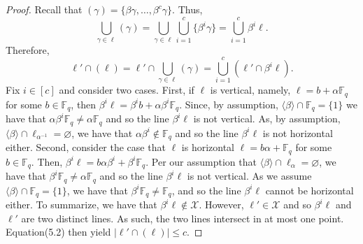 \begin{proof}
Recall that $(\gamma)=\{\beta\gamma,\ldots,\beta^c\gamma\}$. Thus,
\[\bigcup_{\gamma\in\ell}(\gamma)=\bigcup_{\gamma\in\ell}\bigcup_{i=1}^c\{\beta^i\gamma\}=\bigcup_{i=1}^c\beta^i\ell.\]
Therefore,
\begin{equation}\ell'\cap(\ell)=\ell'\cap\bigcup_{\gamma\in\ell}(\gamma)=\bigcup_{i=1}^c(\ell'\cap\beta^i\ell).\tag{5.2}\end{equation}
Fix $i\in[c]$ and consider two cases. First, if $\ell$ is vertical, namely, $\ell=b+\alpha\mathbb F_q$ for some $b\in\mathbb F_q$, then $\beta^i\ell=\beta^ib+\alpha\beta^i\mathbb F_q$. Since, by assumption, $\langle\beta\rangle\cap\mathbb F_q=\{1\}$ we have that $\alpha\beta^i\mathbb F_q\ne\alpha\mathbb F_q$ and so the line $\beta^i\ell$ is not vertical. As, by assumption, $\langle\beta\rangle\cap\ell_{\alpha^{-1}}=\varnothing$, we have that $\alpha\beta^i\notin\mathbb F_q$ and so the line $\beta^i\ell$ is not horizontal either.
Second, consider the case that $\ell$ is horizontal $\ell=b\alpha+\mathbb F_q$ for some $b\in\mathbb F_q$. Then, $\beta^i\ell=b\alpha\beta^i+\beta^i\mathbb F_q$. Per our assumption that $\langle\beta\rangle\cap\ell_\alpha=\varnothing$, we have that $\beta^i\mathbb F_q\ne\alpha\mathbb F_q$ and so the line $\beta^i\ell$ is not vertical. As we assume $\langle\beta\rangle\cap\mathbb F_q=\{1\}$, we have that $\beta^i\mathbb F_q\ne\mathbb F_q$, and so the line $\beta^i\ell$ cannot be horizontal either. To summarize, we have that $\beta^i\ell\notin\mathcal X$. However, $\ell'\in\mathcal X$ and so $\beta^i\ell$ and $\ell'$ are two distinct lines. As such, the two lines intersect in at most one point. Equation(5.2) then yield $|\ell'\cap(\ell)|\leq c$.
\end{proof}
